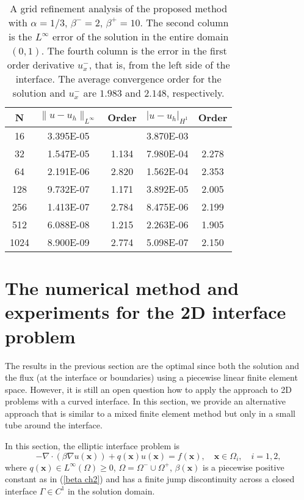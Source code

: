 \documentclass[11pt]{article}
\numberwithin{equation}{section}
\begin{document}
\begin{table}[H]
\centering
\begin{tabular}{|c|c|c|c|c|}
\hline
  N & $\|u-u_h\|_{L^{\infty}}$ &  Order   & $|u-u_h|_{H^1}$  & Order  \\
\hline
16  & 3.395E-05  &       & 3.870E-03 &          \\
\hline
32  & 1.547E-05  & 1.134 & 7.980E-04 & 2.278     \\
\hline
64  & 2.191E-06  & 2.820 & 1.562E-04 & 2.353     \\
\hline
128 & 9.732E-07  & 1.171 & 3.892E-05 & 2.005     \\
\hline
256 & 1.413E-07  & 2.784 & 8.475E-06 & 2.199     \\
\hline
512 & 6.088E-08  & 1.215 & 2.263E-06 & 1.905     \\
\hline
1024& 8.900E-09  & 2.774 & 5.098E-07 & 2.150     \\
\hline
\end{tabular}
\caption{ A grid refinement analysis  of the proposed method with $\alpha=1/3$, $\beta^-=2$, $\beta^+=10$. The second column is the $L^{\infty}$ error of the solution in the entire domain $(0,1)$. The fourth column is the error in the first order derivative $u_x^-$, that is, from the left side of the interface. The average convergence order for the solution and $u_x^-$ are $1.983$ and $2.148$, respectively.}  \label{result1D ch2}
\end{table}





\section{The numerical method and experiments for the 2D interface problem}

The results in the previous section are the optimal since both the solution and the flux (at the interface or boundaries)
using a piecewise linear finite element space.
However, it is still an open question how to apply the approach to 2D problems with a curved interface.
In this section, we provide an alternative approach that is similar to a mixed finite element method
but only in a small tube around the interface.

In this section, the elliptic interface problem is
\begin{equation}\label{2Dpde ch2}
-\nabla \cdot \left(\beta \nabla u(\mathbf{x}) \right) +  q(\mathbf{x}) u(\mathbf{x})  = f(\mathbf{x}), \quad \mathbf{x}\in \Omega_i, \quad \mbox{$i=1,2$},
\end{equation}
where $q(\mathbf{x})\in L^{\infty}(\Omega) \ge 0$, $\Omega=\Omega^-\cup \Omega^+$,
$\beta(\mathbf{x})$ is a piecewise positive constant as in (\ref{beta ch2})
and has a finite jump discontinuity across a closed interface $\Gamma\in C^1$ in the solution domain.
\end{document}
